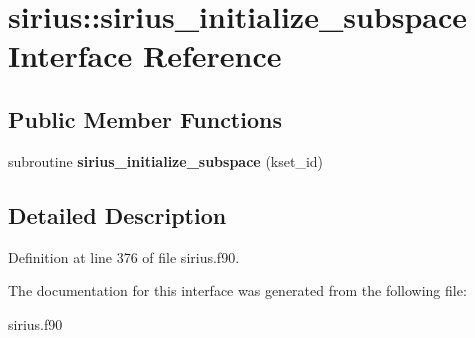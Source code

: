 \hypertarget{interfacesirius_1_1sirius__initialize__subspace}{}\section{sirius\+:\+:sirius\+\_\+initialize\+\_\+subspace Interface Reference}
\label{interfacesirius_1_1sirius__initialize__subspace}
\subsection*{Public Member Functions}
\begin{DoxyCompactItemize}
\item 
\hypertarget{interfacesirius_1_1sirius__initialize__subspace_a1b00525e995f157713358f07c061288d}{}subroutine {\bfseries sirius\+\_\+initialize\+\_\+subspace} (kset\+\_\+id)\label{interfacesirius_1_1sirius__initialize__subspace_a1b00525e995f157713358f07c061288d}

\end{DoxyCompactItemize}


\subsection{Detailed Description}


Definition at line 376 of file sirius.\+f90.



The documentation for this interface was generated from the following file\+:\begin{DoxyCompactItemize}
\item 
sirius.\+f90\end{DoxyCompactItemize}
